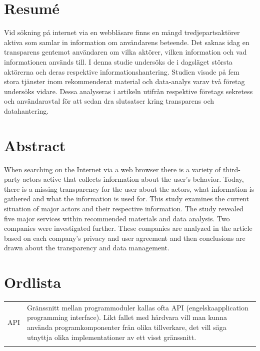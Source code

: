 \documentclass[a4paper,11pt]{article}
\begin{document}
{\newpage

\mbox{}

\newpage

\section*{Resumé}

Vid sökning på internet via en webbläsare finns en mängd tredjepartsaktörer aktiva som samlar in information om användarens beteende. Det saknas idag en transparens gentemot användaren om vilka aktörer, vilken information och vad informationen används till. I denna studie undersöks de i dagsläget största aktörerna och deras respektive informationshantering. Studien visade på fem stora tjänster inom rekommenderat material och data-analys varav två företag undersöks vidare. Dessa analyseras i artikeln utifrån respektive företags sekretess och användaravtal för att sedan dra slutsatser kring  transparens och datahantering. 

\newpage

\mbox{}

\newpage

\section*{Abstract}

When searching on the Internet via a web browser there is a variety of third-party actors active that collects information about the user's behavior. Today, there is a missing transparency for the user about the actors, what information is gathered and what the information is used for. This study examines the current situation of major actors and their respective information. The study revealed five major services within recommended materials and data analysis. Two companies were investigated further. These companies are analyzed in the article based on each company's privacy and user agreement and then conclusions are drawn about the transparency and data management.

\newpage
\mbox{}
\newpage
\section*{Ordlista}

\begin{tabular}{l p{12cm} }
	API & Gränssnitt mellan programmoduler kallas ofta API (engelskaapplication programming interface). Likt fallet med hårdvara vill man kunna använda programkomponenter från olika tillverkare, det vill säga utnyttja olika implementationer av ett visst gränssnitt. \\ \\
	

\end{tabular}}
\end{document}
